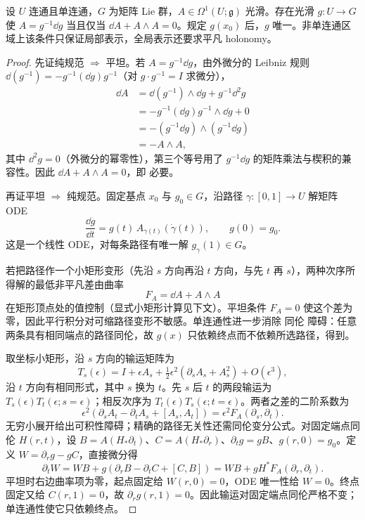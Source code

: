 \begin{theorem}[平坦形式的纯规范表示]
设 $U$ 连通且单连通，$G$ 为矩阵 Lie 群，$A\in\Omega^1(U;\mathfrak g)$ 光滑。存在光滑 $g:U\to G$ 使 $A=g^{-1}\dd g$ 当且仅当 $\dd A+A\wedge A=0$。规定 $g(x_0)$ 后，$g$ 唯一。非单连通区域上该条件只保证局部表示，全局表示还要求平凡 holonomy。
\end{theorem}
\begin{proof}
先证纯规范 $\Rightarrow$ 平坦。若 $A=g^{-1}\dd g$，由外微分的 Leibniz 规则 $\dd(g^{-1})=-g^{-1}(\dd g)g^{-1}$（对 $g\cdot g^{-1}=I$ 求微分），
\begin{align*}
 \dd A
 &=\dd(g^{-1})\wedge\dd g+g^{-1}\dd^2 g\\
 &=-g^{-1}(\dd g)g^{-1}\wedge\dd g+0\\
 &=-(g^{-1}\dd g)\wedge(g^{-1}\dd g)\\
 &=-A\wedge A,
\end{align*}
其中 $\dd^2g=0$（外微分的幂零性），第三个等号用了 $g^{-1}\dd g$ 的矩阵乘法与楔积的兼容性。因此 $\dd A+A\wedge A=0$，即 必要。

再证平坦 $\Rightarrow$ 纯规范。固定基点 $x_0$ 与 $g_0\in G$，沿路径 $\gamma:[0,1]\to U$ 解矩阵 ODE
\begin{equation*}
 \frac{\dd g}{\dd t}
 =g(t)\,A_{\gamma(t)}(\dot\gamma(t)),
 \qquad
 g(0)=g_0.
\end{equation*}
这是一个线性 ODE，对每条路径有唯一解 $g_\gamma(1)\in G$。

若把路径作一个小矩形变形（先沿 $s$ 方向再沿 $t$ 方向，与先 $t$ 再 $s$），两种次序所得解的最低非平凡差由曲率
\begin{equation*}
 F_A=\dd A+A\wedge A
\end{equation*}
在矩形顶点处的值控制（显式小矩形计算见下文）。平坦条件 $F_A=0$ 使这个差为零，因此平行积分对可缩路径变形不敏感。单连通性进一步消除 同伦 障碍：任意两条具有相同端点的路径同伦，故 $g(x)$ 只依赖终点而不依赖所选路径，得到。

取坐标小矩形，沿 $s$ 方向的输运矩阵为
\[
T_s(\epsilon)=I+\epsilon A_s+\tfrac12\epsilon^2(\partial_sA_s+A_s^2)+O(\epsilon^3),
\]
沿 $t$ 方向有相同形式，其中 $s$ 换为 $t$。先 $s$ 后 $t$ 的两段输运为 $T_s(\epsilon)T_t(\epsilon;s=\epsilon)$；相反次序为 $T_t(\epsilon)T_s(\epsilon;t=\epsilon)$。两者之差的二阶系数为
\[
\epsilon^2(\partial_sA_t-\partial_tA_s+[A_s,A_t])=\epsilon^2F_A(\partial_s,\partial_t).
\]
无穷小展开给出可积性障碍；精确的路径无关性还需同伦变分公式。对固定端点同伦 $H(r,t)$，设 $B=A(H_*\partial_t)$、$C=A(H_*\partial_r)$、$\partial_tg=gB$、$g(r,0)=g_0$。定义 $W=\partial_rg-gC$，直接微分得
\[
\partial_tW=WB+g(\partial_rB-\partial_tC+[C,B])=WB+gH^*F_A(\partial_r,\partial_t).
\]
平坦时右边曲率项为零，起点固定给 $W(r,0)=0$，ODE 唯一性给 $W=0$。终点固定又给 $C(r,1)=0$，故 $\partial_rg(r,1)=0$。因此输运对固定端点同伦严格不变；单连通性使它只依赖终点。


\end{proof}
